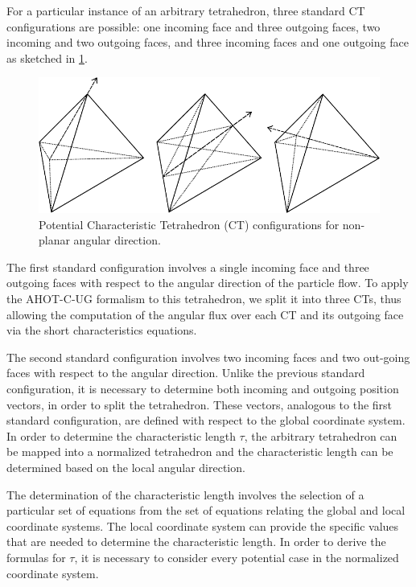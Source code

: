 For a particular instance of an arbitrary tetrahedron, three standard CT configurations are possible: one incoming face and three outgoing faces, two incoming and two outgoing faces, and three incoming faces and one outgoing face as sketched in \ref{fig:non_planar_CTs}.

\begin{figure}[th]
  \includegraphics[width=1.0\textwidth]{chapters/theory/figures/CT_configurations.pdf}
  \caption{Potential Characteristic Tetrahedron (CT) configurations for non-planar angular direction.}
  \label{fig:non_planar_CTs}
\end{figure}

The first standard configuration involves a single incoming face and three outgoing faces with respect to the angular direction of the particle flow.
To apply the \ac{AHOT-C-UG} formalism to this tetrahedron, we split it into three CTs, thus allowing the computation of the angular flux over each CT and its outgoing face via the short characteristics equations.

The second standard configuration involves two incoming faces and two out-going faces with respect to the angular direction.
Unlike the previous standard configuration, it is necessary to determine both incoming and outgoing position vectors, in order to split the tetrahedron.
These vectors, analogous to the first standard configuration, are defined with respect to the global coordinate system.
In order to determine the characteristic length $\tau$, the arbitrary tetrahedron can be mapped into a normalized tetrahedron and the characteristic length can be determined based on the local angular direction.

The determination of the characteristic length involves the selection of a particular set of equations from the set of equations relating the global and local coordinate systems.
The local coordinate system can provide the specific values that are needed to determine the characteristic length.
In order to derive the formulas for $\tau$, it is necessary to consider every potential case in the normalized coordinate system.

